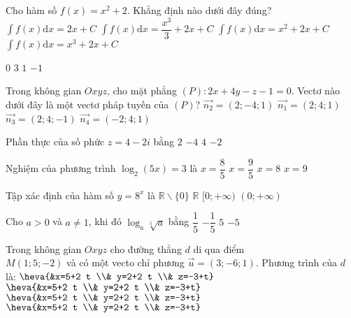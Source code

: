 \begin{ex}%
Cho hàm số $f(x)=x^2+2$. Khẳng định nào dưới đây đúng?
\choice
{$\displaystyle\int f(x) \mathrm{d} x=2 x+C$}
{\True $\displaystyle\int f(x) \mathrm{d} x=\dfrac{x^3}{3}+2 x+C$}
{$\displaystyle\int f(x) \mathrm{d} x=x^2+2 x+C$}
{$\displaystyle\int f(x) \mathrm{d} x=x^3+2 x+C$}

\end{ex}
\begin{ex}%
{\vspace{-0.5cm}
}
\choice
{$0$}
{$3$}
{\True $1$}
{$-1$}
\end{ex}
\begin{ex}%
Trong không gian $O x y z$, cho mặt phẳng $(P)\colon 2 x+4 y-z-1=0$. Vectơ nào dưới đây là một vectơ pháp tuyến của $(P)$?
\choice
{$\overrightarrow{n_2}=(2;-4; 1)$}
{$\overrightarrow{n_1}=(2; 4; 1)$}
{\True $\overrightarrow{n_3}=(2; 4;-1)$}
{$\overrightarrow{n_4}=(-2; 4; 1)$}

\end{ex}
\begin{ex}%
Phần thực của số phức $z=4-2 i$ bằng
\choice
{$2$}
{$-4$}
{\True $4$}
{$-2$}

\end{ex}
\begin{ex}%
Nghiệm của phương trình $\log_2(5 x)=3$ là
\choice
{\True $x=\dfrac{8}{5}$}
{$x=\dfrac{9}{5}$}
{$x=8$}
{$x=9$}

\end{ex}
\begin{ex}%
Tập xác định của hàm số $y=8^{x}$ là
\choice
{$\mathbb{R} \backslash\{0\}$}
{\True $\mathbb{R}$}
{$[0;+\infty)$}
{$(0;+\infty)$}

\end{ex}
\begin{ex}%
Cho $a>0$ và $a \neq 1$, khi đó $\log_a \sqrt[5]{a}$ bằng
\choice
{\True $\dfrac{1}{5}$}
{$-\dfrac{1}{5}$}
{$5$}
{$-5$}

\end{ex}
\begin{ex}%
Trong không gian $O x y z$ cho đường thẳng $d$ di qua điểm\\ $M(1; 5;-2)$ và có một vecto chỉ phương $\vec{u}=(3;-6; 1)$. Phương trình của $d$ là:
\choice
{$\heva{&x=5+2 t \\& y=2+2 t \\& z=-3+t}$}
{$\heva{&x=5+2 t \\& y=2+2 t \\& z=-3+t}$}
{$\heva{&x=5+2 t \\& y=2+2 t \\& z=-3+t}$}
{\True $\heva{&x=5+2 t \\& y=2+2 t \\& z=-3+t}$}

\end{ex}
